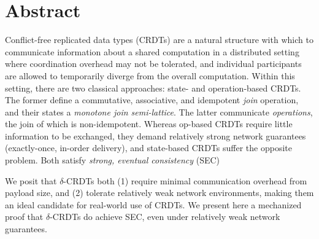 \chapter{Abstract}

Conflict-free replicated data types (CRDTs) are a natural structure with which
to communicate information about a shared computation in a distributed setting
where coordination overhead may not be tolerated, and individual participants
are allowed to temporarily diverge from the overall computation.  Within this
setting, there are two classical approaches: state- and operation-based CRDTs.
The former define a commutative, associative, and idempotent \textit{join}
operation, and their states a \textit{monotone join semi-lattice}. The latter
communicate \textit{operations}, the join of which is non-idempotent. Whereas
op-based CRDTs require little information to be exchanged, they demand
relatively strong network guarantees (exactly-once, in-order delivery), and
state-based CRDTs suffer the opposite problem. Both satisfy \textit{strong,
eventual consistency} (SEC)

We posit that $\delta$-CRDTs both (1) require minimal communication overhead
from payload size, and (2) tolerate relatively weak network environments, making
them an ideal candidate for real-world use of CRDTs. We present here a
mechanized proof that $\delta$-CRDTs do achieve SEC, even under relatively weak
network guarantees.
